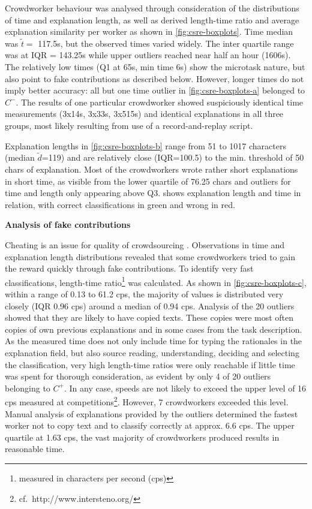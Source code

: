 Crowdworker behaviour was analysed through consideration of the distributions of time and explanation length, as well as derived length-time ratio and average explanation similarity per worker as shown in \cref{fig:csre-boxplots}.
Time median was \(\tilde t=\) 117.5s, but the observed times varied widely.
The inter quartile range was at IQR = 143.25s while upper outliers reached near half an hour (1606s).
The relatively low times (Q1 at 65s, min time 6s) show the microtask nature, but also point to fake contributions as described below.
However, longer times do not imply better accuracy: all but one time outlier in \cref{fig:csre-boxplots-a} belonged to \(C^-\).
The results of one particular crowdworker showed suspiciously identical time measurements (3x14s, 3x33s, 3x515s) and identical explanations in all three groups, most likely resulting from use of a record-and-replay script.

Explanation lengths in \cref{fig:csre-boxplots-b} range from 51 to 1017 characters (median
\(\tilde{d}\)=119) and are relatively close (IQR=100.5) to the min.
threshold of 50 chars of explanation.
Most of the crowdworkers wrote rather short explanations in short time, as visible from the lower quartile of 76.25 chars and outliers for time and length only appearing above Q3.
 shows explanation length and time in relation, with correct classifications in green and wrong in red.

\textbf{Analysis of fake contributions}

Cheating is an issue for quality of crowdsourcing \autocite{Allahbakhsh2013}.
Observations in time and explanation length distributions revealed that some crowdworkers tried to gain the reward quickly through fake contributions.
To identify very fast classifications, length-time ratio\footnote{measured in characters per second (cps)} was calculated.
As shown in \cref{fig:csre-boxplots-c}, within a range of 0.13 to 61.2 cps, the majority of values is distributed very closely (IQR 0.96 cps) around a median of 0.94 cps.
Analysis of the 20 outliers showed that they are likely to have copied texts.
These copies were most often copies of own previous explanations and in some cases from the task description.
As the measured time does not only include time for typing the rationales in the explanation field, but also source reading, understanding, deciding and selecting the classification, very high length-time ratios were only reachable if little time was spent for thorough consideration, as evident by only 4 of 20 outliers belonging to \(C^+\).
In any case, speeds are not likely to exceed the upper level of 16 cps measured at competitions\footnote{cf.~http://www.intersteno.org/}.
However, 7 crowdworkers exceeded this level.
Manual analysis of explanations provided by the outliers determined the fastest worker not to copy text and to classify correctly at approx.
6.6 cps.
The upper quartile at 1.63 cps, the vast majority of crowdworkers produced results in reasonable time.

